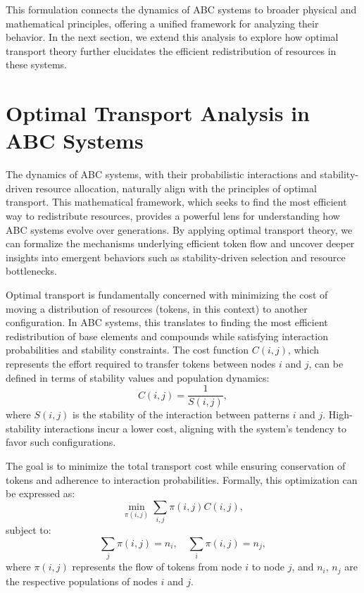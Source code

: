 \documentclass[%
 preprint, linenumbers,
 amsmath,amssymb,
 aps, physrev,
]{revtex4-2}
\begin{document}
This formulation connects the dynamics of ABC systems to broader physical and mathematical principles, offering a unified framework for analyzing their behavior. In the next section, we extend this analysis to explore how optimal transport theory further elucidates the efficient redistribution of resources in these systems.

\section{Optimal Transport Analysis in ABC Systems}

The dynamics of ABC systems, with their probabilistic interactions and stability-driven resource allocation, naturally align with the principles of optimal transport. This mathematical framework, which seeks to find the most efficient way to redistribute resources, provides a powerful lens for understanding how ABC systems evolve over generations. By applying optimal transport theory, we can formalize the mechanisms underlying efficient token flow and uncover deeper insights into emergent behaviors such as stability-driven selection and resource bottlenecks.

Optimal transport is fundamentally concerned with minimizing the cost of moving a distribution of resources (tokens, in this context) to another configuration. In ABC systems, this translates to finding the most efficient redistribution of base elements and compounds while satisfying interaction probabilities and stability constraints. The cost function $C(i, j)$, which represents the effort required to transfer tokens between nodes $i$ and $j$, can be defined in terms of stability values and population dynamics:
\begin{equation}
C(i, j) = \frac{1}{S(i, j)},
\end{equation}
where $S(i, j)$ is the stability of the interaction between patterns $i$ and $j$. High-stability interactions incur a lower cost, aligning with the system’s tendency to favor such configurations.

The goal is to minimize the total transport cost while ensuring conservation of tokens and adherence to interaction probabilities. Formally, this optimization can be expressed as:
\begin{equation}
\min_{\pi(i,j)} \sum_{i,j} \pi(i, j) C(i, j),
\end{equation}
subject to:
\begin{equation}
\sum_j \pi(i, j) = n_i, \quad \sum_i \pi(i, j) = n_j,
\end{equation}
where $\pi(i, j)$ represents the flow of tokens from node $i$ to node $j$, and $n_i$, $n_j$ are the respective populations of nodes $i$ and $j$.
\end{document}
